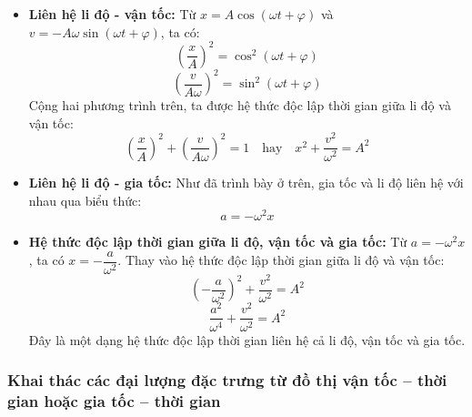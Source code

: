 \begin{kienthuc}
\begin{itemize}
    \item \textbf{Liên hệ li độ - vận tốc:}
    Từ $x = A\cos(\omega t + \varphi)$ và $v = -A\omega\sin(\omega t + \varphi)$, ta có:
    $$\left(\dfrac{x}{A}\right)^2 = \cos^2(\omega t + \varphi)$$
    $$\left(\dfrac{v}{A\omega}\right)^2 = \sin^2(\omega t + \varphi)$$
    Cộng hai phương trình trên, ta được hệ thức độc lập thời gian giữa li độ và vận tốc:
    $$\left(\dfrac{x}{A}\right)^2 + \left(\dfrac{v}{A\omega}\right)^2 = 1 \quad \text{hay} \quad x^2 + \dfrac{v^2}{\omega^2} = A^2$$
    \item \textbf{Liên hệ li độ - gia tốc:}
    Như đã trình bày ở trên, gia tốc và li độ liên hệ với nhau qua biểu thức:
    $$a = -\omega^2 x$$
    \item \textbf{Hệ thức độc lập thời gian giữa li độ, vận tốc và gia tốc:}
    Từ $a = -\omega^2 x$, ta có $x = -\dfrac{a}{\omega^2}$. Thay vào hệ thức độc lập thời gian giữa li độ và vận tốc:
    $$\left(-\dfrac{a}{\omega^2}\right)^2 + \dfrac{v^2}{\omega^2} = A^2$$
    $$\dfrac{a^2}{\omega^4} + \dfrac{v^2}{\omega^2} = A^2$$
    Đây là một dạng hệ thức độc lập thời gian liên hệ cả li độ, vận tốc và gia tốc.
\end{itemize}
\end{kienthuc}

\subsubsection{Khai thác các đại lượng đặc trưng từ đồ thị vận tốc – thời gian hoặc gia tốc – thời gian}

